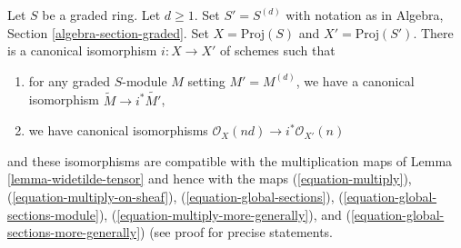 \begin{lemma}
\label{lemma-d-uple}
Let $S$ be a graded ring. Let $d \geq 1$. Set $S' = S^{(d)}$ with notation
as in Algebra, Section \ref{algebra-section-graded}. Set
$X = \text{Proj}(S)$ and $X' = \text{Proj}(S')$. There is a canonical
isomorphism $i : X \to X'$ of schemes such that
\begin{enumerate}
\item for any graded $S$-module $M$ setting $M' = M^{(d)}$,
we have a canonical isomorphism $\widetilde{M} \to i^*\widetilde{M'}$,
\item we have canonical isomorphisms
$\mathcal{O}_{X}(nd) \to i^*\mathcal{O}_{X'}(n)$
\end{enumerate}
and these isomorphisms are compatible with the multiplication maps
of Lemma \ref{lemma-widetilde-tensor} and hence with the maps
(\ref{equation-multiply}),
(\ref{equation-multiply-on-sheaf}),
(\ref{equation-global-sections}),
(\ref{equation-global-sections-module}),
(\ref{equation-multiply-more-generally}), and
(\ref{equation-global-sections-more-generally}) (see proof for precise
statements.
\end{lemma}

